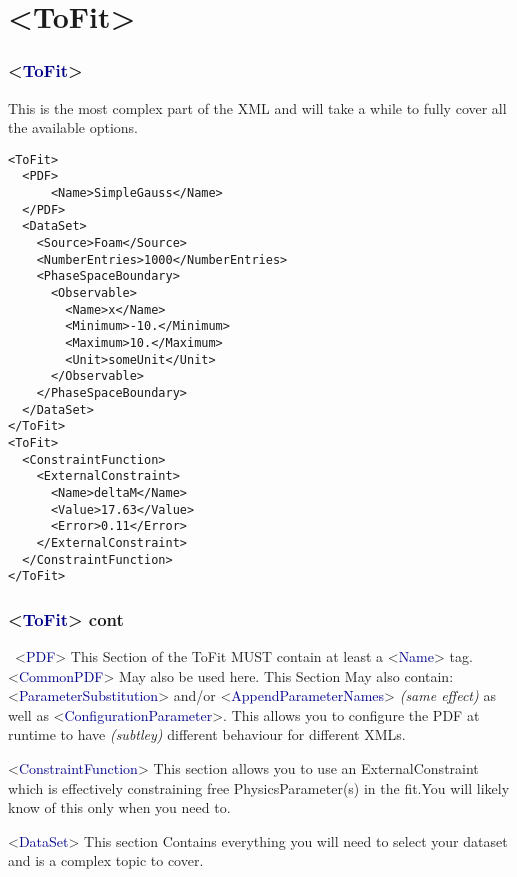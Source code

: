 \documentclass{beamer}
\begin{document}
\section{<ToFit>}
\begin{frame}[fragile]
\frametitle{<\textcolor{darkblue}{ToFit}>}
This is the most complex part of the XML and will take a while to fully cover all the available options.
\tiny
\begin{lstlisting}[tabsize=8]
<ToFit>
  <PDF>
      <Name>SimpleGauss</Name>
  </PDF>
  <DataSet>
    <Source>Foam</Source>
    <NumberEntries>1000</NumberEntries>
    <PhaseSpaceBoundary>
      <Observable>
        <Name>x</Name>
        <Minimum>-10.</Minimum>
        <Maximum>10.</Maximum>
        <Unit>someUnit</Unit>
      </Observable>
    </PhaseSpaceBoundary>
  </DataSet>
</ToFit>
<ToFit>
  <ConstraintFunction>
    <ExternalConstraint>
      <Name>deltaM</Name>
      <Value>17.63</Value>
      <Error>0.11</Error>
    </ExternalConstraint>
  </ConstraintFunction>
</ToFit>
\end{lstlisting}
\end{frame}

\begin{frame}
\frametitle{<\textcolor{darkblue}{ToFit}> cont}
\scriptsize~<\textcolor{darkblue}{PDF}> This Section of the ToFit MUST contain at least a <\textcolor{darkblue}{Name}> tag.\newline
<\textcolor{darkblue}{CommonPDF}> May also be used here.\newline
This Section May also contain:\newline
<\textcolor{darkblue}{ParameterSubstitution}> and/or <\textcolor{darkblue}{AppendParameterNames}> \textit{(same effect)}\newline
as well as <\textcolor{darkblue}{ConfigurationParameter}>.\newline
This allows you to configure the PDF at runtime to have \textit{(subtley)} different behaviour for different XMLs.\newline\newline

<\textcolor{darkblue}{ConstraintFunction}> This section allows you to use an ExternalConstraint which is effectively constraining free PhysicsParameter(s) in the fit.\newline You will likely know of this only when you need to.\newline\newline

<\textcolor{darkblue}{DataSet}> This section Contains everything you will need to select your dataset and is a complex topic to cover.
\end{frame}
\end{document}
